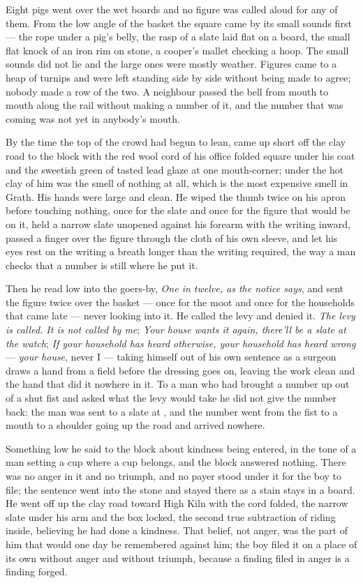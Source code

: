 Eight pigs went over the wet boards and no figure was called aloud for any of them. From the low angle of the basket the square came by its small sounds first --- the rope under a pig's belly, the rasp of a slate laid flat on a board, the small flat knock of an iron rim on stone, a cooper's mallet checking a hoop. The small sounds did not lie and the large ones were mostly weather. Figures came to a heap of turnips and were left standing side by side without being made to agree; nobody made a row of the two. A neighbour passed the bell from mouth to mouth along the rail without making a number of it, and the number that was coming was not yet in anybody's mouth.

By the time the top of the crowd had begun to lean,  came up short off the clay road to the block with the red wool cord of his office folded square under his coat and the sweetish green of tasted lead glaze at one mouth-corner; under the hot clay of him was the smell of nothing at all, which is the most expensive smell in Grath. His hands were large and clean. He wiped the thumb twice on his apron before touching nothing, once for the slate and once for the figure that would be on it, held a narrow slate unopened against his forearm with the writing inward, passed a finger over the figure through the cloth of his own sleeve, and let his eyes rest on the writing a breath longer than the writing required, the way a man checks that a number is still where he put it.

Then he read low into the goers-by, \emph{One in twelve, as the notice says}, and sent the figure twice over the basket --- once for the moot and once for the households that came late --- never looking into it. He called the levy and denied it. \emph{The levy is called. It is not called by me}; \emph{Your house wants it again, there'll be a slate at the watch}; \emph{If your household has heard otherwise, your household has heard wrong} --- \emph{your house}, never I --- taking himself out of his own sentence as a surgeon draws a hand from a field before the dressing goes on, leaving the work clean and the hand that did it nowhere in it. To a man who had brought a number up out of a shut fist and asked what the levy would take he did not give the number back: the man was sent to a slate at , and the number went from the fist to a mouth to a shoulder going up the road and arrived nowhere.

Something low he said to the block about kindness being entered, in the tone of a man setting a cup where a cup belongs, and the block answered nothing. There was no anger in it and no triumph, and no payer stood under it for the boy to file; the sentence went into the stone and stayed there as a stain stays in a board. He went off up the clay road toward High Kiln with the cord folded, the narrow slate under his arm and the box locked, the second true subtraction of  riding inside, believing he had done a kindness. That belief, not anger, was the part of him that would one day be remembered against him; the boy filed it on a place of its own without anger and without triumph, because a finding filed in anger is a finding forged.

